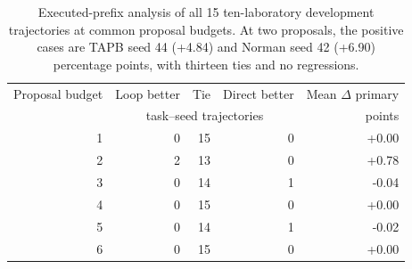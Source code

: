 \begin{table}[t]
\caption{Executed-prefix analysis of all 15 ten-laboratory development trajectories at common proposal budgets. At two proposals, the positive cases are TAPB seed 44 (+4.84) and Norman seed 42 (+6.90) percentage points, with thirteen ties and no regressions.}
\label{tab:loop-prefix}
\centering\small
\setlength{\tabcolsep}{6pt}
\begin{tabular}{rrrrr}
\toprule
Proposal budget & Loop better & Tie & Direct better & Mean $\Delta$ primary \\
 & \multicolumn{3}{c}{task--seed trajectories} & points \\
\midrule
1 & 0 & 15 & 0 & +0.00 \\
2 & 2 & 13 & 0 & +0.78 \\
3 & 0 & 14 & 1 & -0.04 \\
4 & 0 & 15 & 0 & +0.00 \\
5 & 0 & 14 & 1 & -0.02 \\
6 & 0 & 15 & 0 & +0.00 \\
\bottomrule
\end{tabular}
\end{table}
